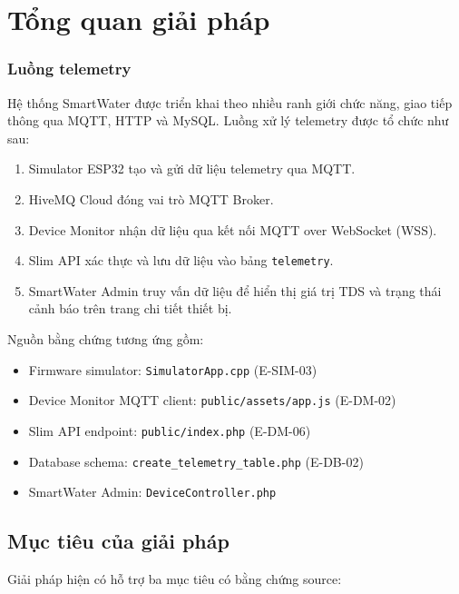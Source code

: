 \chapter{Tổng quan giải pháp}
\label{chap:solution-overview}

\subsection{Luồng telemetry}

Hệ thống SmartWater được triển khai theo nhiều ranh giới chức năng, giao tiếp thông qua
MQTT, HTTP và MySQL. Luồng xử lý telemetry được tổ chức như sau:

\begin{enumerate}
    \item Simulator ESP32 tạo và gửi dữ liệu telemetry qua MQTT.
    \item HiveMQ Cloud đóng vai trò MQTT Broker.
    \item Device Monitor nhận dữ liệu qua kết nối MQTT over WebSocket (WSS).
    \item Slim API xác thực và lưu dữ liệu vào bảng \texttt{telemetry}.
    \item SmartWater Admin truy vấn dữ liệu để hiển thị giá trị TDS và trạng thái cảnh báo trên trang chi tiết thiết bị.
\end{enumerate}

Nguồn bằng chứng tương ứng gồm:

\begin{itemize}
    \item Firmware simulator: \texttt{SimulatorApp.cpp} (E-SIM-03)
    \item Device Monitor MQTT client: \texttt{public/assets/app.js} (E-DM-02)
    \item Slim API endpoint: \texttt{public/index.php} (E-DM-06)
    \item Database schema: \texttt{create\_telemetry\_table.php} (E-DB-02)
    \item SmartWater Admin: \texttt{DeviceController.php}
\end{itemize}


\section{Mục tiêu của giải pháp}

Giải pháp hiện có hỗ trợ ba mục tiêu có bằng chứng source:


